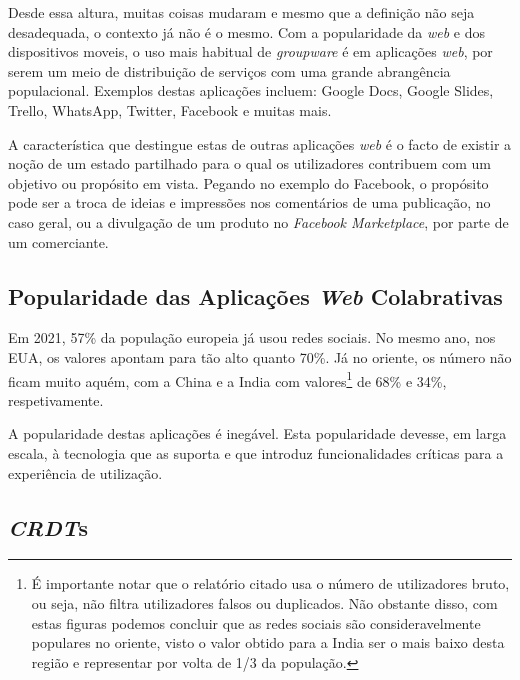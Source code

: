\documentclass[runningheads]{llncs}
\begin{document}
        Desde essa altura, muitas coisas mudaram e mesmo que a definição não
        seja desadequada, o contexto já não é o mesmo. Com a popularidade da
        {\itshape web} e dos dispositivos moveis, o uso mais habitual de
        {\itshape groupware} é em aplicações {\itshape web}, por serem um meio
        de distribuição de serviços com uma grande abrangência populacional.
        Exemplos destas aplicações incluem: Google Docs, Google Slides, Trello,
        WhatsApp, Twitter, Facebook e muitas mais. 

        A característica que destingue estas de outras aplicações {\itshape web}
        é o facto de existir a noção de um estado partilhado para o qual os
        utilizadores contribuem com um objetivo ou propósito em vista. Pegando
        no exemplo do Facebook, o propósito pode ser a troca de ideias e
        impressões nos comentários de uma publicação, no caso geral, ou a
        divulgação de um produto no {\itshape Facebook Marketplace}, por parte
        de um comerciante.

        \subsection{Popularidade das Aplicações {\itshape Web} Colabrativas}

        Em 2021, 57\%\cite{eurostat-soc-media-usage} da população europeia já
        usou redes sociais. No mesmo ano, nos EUA, os valores apontam para tão
        alto quanto 70\%\cite{usa-soc-media-usage}. Já no oriente, os número não
        ficam muito aquém, com a China e a India com valores\footnote{É
        importante notar que o relatório citado usa o número de utilizadores
        bruto, ou seja, não filtra utilizadores falsos ou duplicados. Não
        obstante disso, com estas figuras podemos concluir que as redes sociais
        são consideravelmente populares no oriente, visto o valor obtido para a
        India ser o mais baixo desta região e representar por volta de 1/3 da
        população.} de 68\% e 34\%, respetivamente\cite{digital2022}.

        A popularidade destas aplicações é inegável. Esta popularidade devesse,
        em larga escala, à tecnologia que as suporta e que introduz
        funcionalidades críticas para a experiência de utilização. 


        \subsection{{\itshape CRDT}s}
\end{document}
